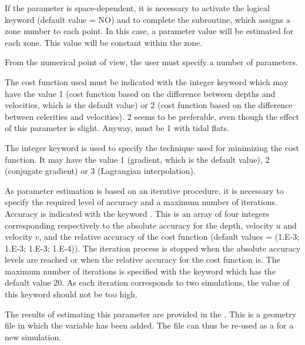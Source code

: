If the parameter is space-dependent, it is necessary to activate the logical
keyword  (default value = NO)
and to complete the  subroutine,
which assigns a zone number to each point.
In this case, a parameter value will be estimated for each zone.
This value will be constant within the zone.

From the numerical point of view, the user must specify a number of parameters.

The cost function used must be indicated with the integer keyword
 which may have the value 1 (cost function based on the
difference between depths and velocities, which is the default value)
or 2 (cost function based on the difference between celerities and velocities).
2 seems to be preferable, even though the effect of this parameter is slight.
Anyway,  must be 1 with tidal flats.

The integer keyword  is used to specify
the technique used for minimizing the cost function.
It may have the value 1 (gradient, which is the default value), 2 (conjugate
gradient) or 3 (Lagrangian interpolation).

As parameter estimation is based on an iterative procedure, it is necessary to
specify the required level of accuracy and a maximum number of iterations.
Accuracy is indicated with the keyword .
This is an array of four integers corresponding respectively to the absolute
accuracy for the depth, velocity $u$ and velocity $v$, and the relative accuracy
of the cost function (default values = (1.E-3; 1.E-3; 1.E-3; 1.E-4)).
The iteration process is stopped when the absolute accuracy levels are reached
or when the relative accuracy for the cost function is.
The maximum number of iterations is specified with the keyword
 which has the default
value 20.
As each iteration corresponds to two simulations,
the value of this keyword should not be too high.

The results of estimating this parameter are provided in the
.
This is a geometry file in which the  variable has been added.
The file can thus be re-used as a  for a new simulation.
